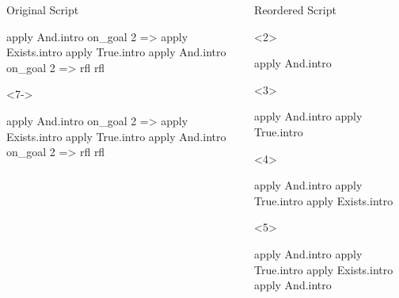 \begin{frame}[fragile]
\begin{columns}[onlytextwidth,t]
\begin{column}{.6\textwidth}
\begin{block}{Original Script}
\begin{onlyenv}
\begin{leancode}[highlightlines=5]
            apply And.intro
            on_goal 2 => apply Exists.intro
            apply True.intro
            apply And.intro
            on_goal 2 => rfl
            rfl
          \end{leancode}
        \end{onlyenv}
        \begin{onlyenv}<7->
          \begin{leancode}[highlightlines=6]
            apply And.intro
            on_goal 2 => apply Exists.intro
            apply True.intro
            apply And.intro
            on_goal 2 => rfl
            rfl
          \end{leancode}
        \end{onlyenv}
      \end{block}
    \end{column}

    \begin{column}{.38\textwidth}
      \begin{block}{Reordered Script}
        \begin{onlyenv}<2>
          \begin{leancode}[highlightlines=1]
            apply And.intro





          \end{leancode}
        \end{onlyenv}
        \begin{onlyenv}<3>
          \begin{leancode}[highlightlines=2]
            apply And.intro
            apply True.intro




          \end{leancode}
        \end{onlyenv}
        \begin{onlyenv}<4>
          \begin{leancode}[highlightlines=3]
            apply And.intro
            apply True.intro
            apply Exists.intro



          \end{leancode}
        \end{onlyenv}
        \begin{onlyenv}<5>
          \begin{leancode}[highlightlines=4]
            apply And.intro
            apply True.intro
            apply Exists.intro
            apply And.intro



\end{leancode}
\end{onlyenv}
\end{block}
\end{column}
\end{columns}
\end{frame}
